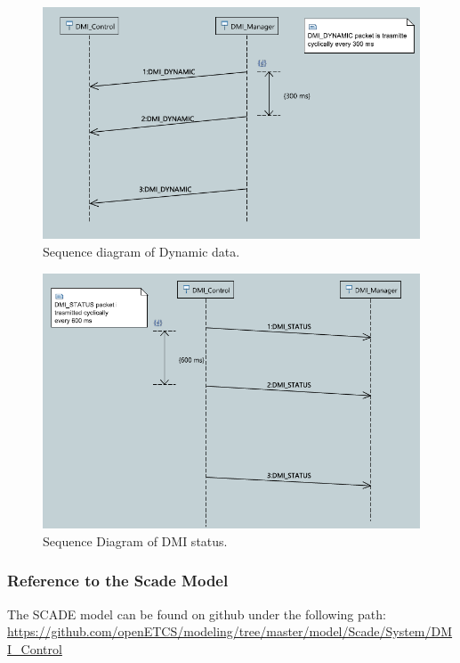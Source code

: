     \begin{figure}
      \centering
      \includegraphics[scale=0.5]{images/DynamicPacket_SeqDia}
      \caption{ Sequence diagram of Dynamic data.}\label{fig:SeqDiaDyn}
    \end{figure}
  
    \begin{figure}
      \centering
      \includegraphics[scale=0.5]{images/DMIStatus_SeqDia}
      \caption{Sequence Diagram of DMI status.}\label{fig:SeqDiaStatus}
     \end{figure}
     

\subsubsection{Reference to the Scade Model}

The SCADE model can be found on github under the following path: \url{https://github.com/openETCS/modeling/tree/master/model/Scade/System/DMI_Control}